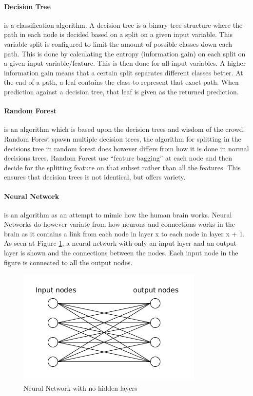 \paragraph{Decision Tree} is a classification algorithm. 
A decision tree is a binary tree structure where the path in each node is decided based on a split on a given input variable.
This variable split is configured to limit the amount of possible classes down each path. This is done by calculating the entropy (information gain) on each split on a given input variable/feature. This is then done for all input variables. A higher information gain means that a certain split separates different classes better.  
At the end of a path, a leaf contains the class to represent that exact path.
When prediction against a decision tree, that leaf is given as the returned prediction.


\paragraph{Random Forest} is an algorithm which is based upon the decision trees and wisdom of the crowd.
Random Forest spawn multiple decision trees, the algorithm for splitting in the decisions tree in random forest does however differs from how it is done in normal decisions trees.
Random Forest use ``feature bagging'' at each node and then decide for the splitting feature on that subset rather than all the features. This ensures that decision trees is not identical, but offers variety.

\paragraph{Neural Network} is an algorithm as an attempt to mimic how the human brain works.
Neural Networks do however variate from how neurons and connections works in the brain as it contains a link from each node in layer x to each node in layer x + 1. As seen at Figure \ref{fig:neuralnetwork}, a neural network with only an input layer and an output layer is shown and the connections between the nodes. Each input node in the figure is connected to all the output nodes.

\begin{figure}
  \centering
  \includegraphics[width=0.7\linewidth]{Images/neuralnetwork}
  \caption{Neural Network with no hidden layers}
  \label{fig:neuralnetwork}
\end{figure}

